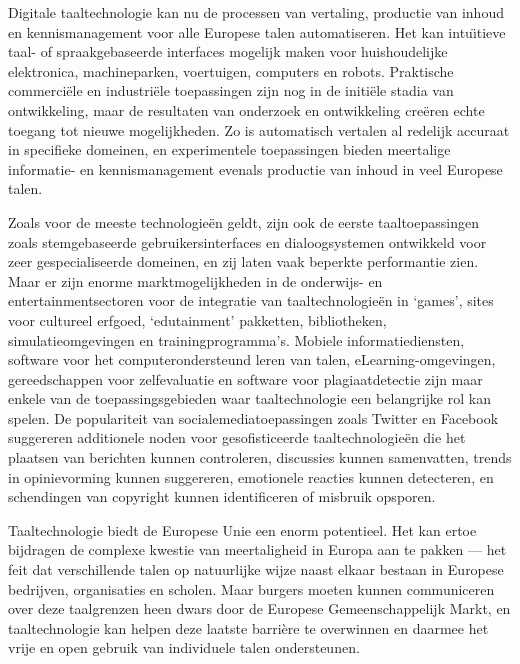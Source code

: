 \begin{multicols}{2}
    Digitale taaltechnologie kan nu de processen van vertaling, productie van inhoud en kennismanagement voor alle Europese talen automatiseren. Het kan intu{\"\i}tieve taal- of spraakgebaseerde interfaces mogelijk maken voor huishoudelijke elektronica, machineparken, voertuigen, computers en robots. Praktische commerci{\"e}le en industri{\"e}le toepassingen zijn nog in de initi{\"e}le stadia van ontwikkeling, maar de resultaten van onderzoek en ontwikkeling cre{\"e}ren echte toegang tot nieuwe mogelijkheden. Zo is automatisch vertalen al redelijk accuraat in specifieke domeinen, en experimentele toepassingen bieden meertalige informatie- en kennismanagement evenals productie van inhoud in veel Europese talen.

    Zoals voor de meeste technologie{\"e}n geldt, zijn ook de eerste taaltoepassingen zoals stemgebaseerde gebruikersinterfaces en dialoogsystemen ontwikkeld voor zeer gespecialiseerde domeinen, en zij laten vaak beperkte performantie zien. Maar er zijn enorme marktmogelijkheden in de onderwijs- en entertainmentsectoren voor de integratie van taaltechnologie{\"e}n in `games', sites voor cultureel erfgoed, `edutainment' pakketten, bibliotheken, simulatieomgevingen en trainingprogramma's. Mobiele informatiediensten, software voor het computerondersteund leren van talen, eLearning-omgevingen, gereedschappen voor zelfevaluatie en software voor plagiaatdetectie zijn maar enkele van de toepassingsgebieden waar taaltechnologie een belangrijke rol kan spelen. De populariteit van socialemediatoepassingen zoals Twitter en Facebook suggereren additionele noden voor gesofisticeerde taaltechnologie{\"e}n die het plaatsen van berichten kunnen controleren, discussies kunnen samenvatten, trends in opinievorming kunnen suggereren, emotionele reacties kunnen detecteren, en schendingen van copyright kunnen identificeren of misbruik opsporen.


    Taaltechnologie biedt de Europese Unie een enorm potentieel. Het kan ertoe bijdragen de complexe kwestie van meertaligheid in Europa aan te pakken --- het feit dat verschillende talen op natuurlijke wijze naast elkaar bestaan in Europese bedrijven, organisaties en scholen. Maar burgers moeten kunnen communiceren over deze taalgrenzen heen dwars door de Europese Gemeenschappelijk Markt, en taaltechnologie kan helpen deze laatste barri{\`e}re te overwinnen en daarmee het vrije en open gebruik van individuele talen ondersteunen.


\end{multicols}
